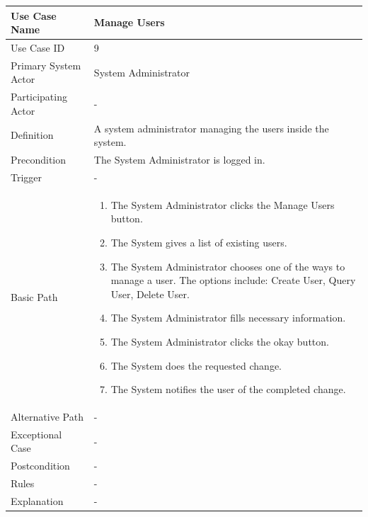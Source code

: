 \documentclass[a4paper,12pt]{report}
\begin{document}
		\begin{tabular}{|m{4cm}|m{11.5cm}|}
			\hline
				Use Case Name & Manage Users\\
			\hline
				Use Case ID & 9\\
			\hline
				Primary System Actor & System Administrator\\
			\hline
				Participating Actor & -\\
			\hline
				Definition & A system administrator managing the users inside the system.\\
			\hline
				Precondition & The System Administrator is logged in.\\
			\hline
				Trigger & -\\
			\hline
				Basic Path & \begin{enumerate}
					\item The System Administrator clicks the Manage Users button.
					\item The System gives a list of existing users.
					\item The System Administrator chooses one of the ways to manage a user. The options include: Create User, Query User, Delete User.
					\item The System Administrator fills necessary information.
					\item The System Administrator clicks the okay button.
					\item The System does the requested change.
					\item The System notifies the user of the completed change.
				\end{enumerate}		
				\\
			\hline
				Alternative Path & -\\
			\hline
				Exceptional Case & -\\
			\hline
				Postcondition & -\\
			\hline
				Rules & -\\
			\hline
				Explanation & -\\
			\hline
		\end{tabular}
\end{document}
